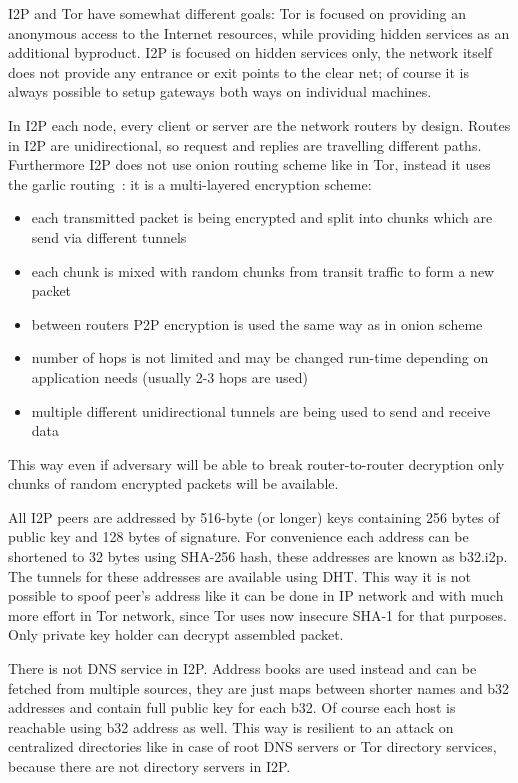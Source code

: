 \documentclass[10pt, a5paper]{article}
\begin{document}
I2P and Tor have somewhat different goals: Tor is focused \linebreak on providing an anonymous access to the Internet resources, while providing hidden services as an additional byproduct. I2P is focused on hidden services only, the network itself does not provide any entrance or exit points to the clear net; of course it is always possible to setup gateways both ways on individual machines.

In I2P each node, every client or server are the network routers by design. Routes in I2P are unidirectional, so request and replies are travelling different paths. Furthermore I2P does not use onion routing scheme like in Tor, instead it uses the garlic routing~\cite{Savchenko-3}: it is a multi-layered encryption scheme:

\begin{itemize}
  \item each transmitted packet is being encrypted and split into chunks which are send via different tunnels
  \item each chunk is mixed with random chunks from transit traffic to form a new packet
  \item between routers P2P encryption is used the same way as in onion scheme
  \item number of hops is not limited and may be changed run-time depending on application needs (usually 2-3 hops are used)
  \item multiple different unidirectional tunnels are being used to send and receive data
\end{itemize}

This way even if adversary will be able to break router-to-router decryption only chunks of random encrypted packets will be available.

All I2P peers are addressed by 516-byte (or longer) keys containing 256 bytes of public key and 128 bytes of signature. For convenience each address can be shortened to 32 bytes using SHA-256 hash, these addresses are known as b32.i2p. The tunnels for these addresses are available using DHT. This way it is not possible to spoof peer's address like it can be done in IP network and with much more effort in Tor network, since Tor uses now insecure SHA-1 for that purposes. Only private key holder can decrypt assembled packet.

There is not DNS service in I2P. Address books are used instead and can be fetched from multiple sources, they are just maps between shorter names and b32 addresses and contain full public key for each b32. Of course each host is reachable using b32 address as well. This way is resilient to an attack on centralized directories like in case of root DNS servers or Tor directory services, because there are not directory servers in I2P.
\end{document}
